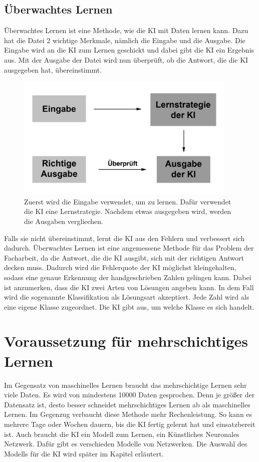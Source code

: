 \documentclass[11pt]{article}
\begin{document}
\subsection{Überwachtes Lernen}
Überwachtes Lernen ist eine Methode, wie die KI mit Daten lernen kann. Dazu hat die Datei 2 wichtige Merkmale, nämlich die Eingabe und die
Ausgabe. Die Eingabe wird an die KI zum Lernen geschickt und dabei gibt die KI ein Ergebnis aus. Mit der Ausgabe der Datei wird nun überprüft, ob
die Antwort, die die KI ausgegeben hat, übereinstimmt.
\begin{figure}[h]
    \centering
    \includegraphics[width=300pt, keepaspectratio]{images/slearning}
    \caption[Ablauf eines überwachtes Lernen]{Zuerst wird die Eingabe verwendet, um zu lernen. Dafür verwendet die KI eine Lernstrategie. Nachdem etwas
    ausgegeben wird, werden die Ausgaben vergliechen.}
\end{figure}
Falls sie nicht übereinstimmt, lernt die KI aus den Fehlern und verbessert sich
dadurch. Überwachtes Lernen ist eine angemessene Methode für das Problem der Facharbeit, da die Antwort, die die KI ausgibt, sich mit der richtigen Antwort decken muss.
Dadurch wird die Fehlerquote der KI möglichst kleingehalten, sodass eine genaue Erkennung der handgeschrieben Zahlen gelingen kann.
Dabei ist anzumerken, dass die KI zwei Arten von Lösungen angeben kann. In dem Fall wird die sogenannte Klassifikation als Lösungsart akzeptiert.
Jede Zahl wird als eine eigene Klasse zugeordnet. Die KI gibt aus, um welche Klasse es sich handelt.

\section{Voraussetzung für mehrschichtiges Lernen}
Im Gegensatz von maschinelles Lernen braucht das mehrschichtige Lernen sehr viele Daten. Es wird von mindestens 10000 Daten gesprochen.
Denn je größer der Datensatz ist, desto besser schneidet mehrschichtiges Lernen ab als maschinelles Lernen. Im Gegenzug verbaucht diese Methode mehr
Rechenleistung. So kann es mehrere Tage oder Wochen dauern, bis die KI fertig gelernt hat und einsatzbereit ist. Auch braucht die KI ein Modell zum
Lernen, ein Künstliches Neuronales Netzwerk. Dafür gibt es verschieden Modelle von Netzwerken. Die Auswahl des Modells für die KI wird später im Kapitel
 erläutert.
\end{document}
